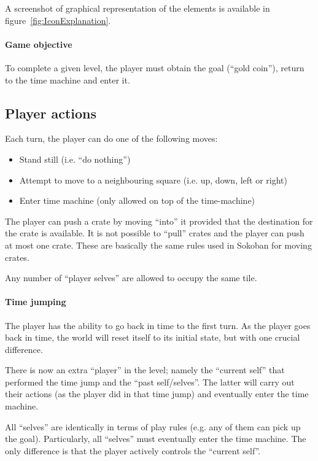 A screenshot of graphical representation of the elements is available
in figure~\ref{fig:IconExplanation}.


\paragraph{Game objective}
To complete a given level, the player must obtain the goal (``gold coin''),
return to the time machine and enter it.

\subsection{Player actions}
\label{player-actions}
Each turn, the player can do one of the following moves:

\begin{itemize}
\item Stand still (i.e. ``do nothing'')
\item Attempt to move to a neighbouring square (i.e. up, down, left or right)
\item Enter time machine (only allowed on top of the time-machine)
\end{itemize}

The player can push a crate by moving ``into'' it provided that the
destination for the crate is available.  It is not possible to
``pull'' crates and the player can push at most one crate.  These
are basically the same rules used in Sokoban for moving crates.

Any number of ``player selves'' are allowed to occupy the same
tile.

\paragraph{Time jumping}
\label{time-jumping}
The player has the ability to go back in time to the first turn.  As
the player goes back in time, the world will reset itself to its
initial state, but with one crucial difference.

There is now an extra ``player'' in the level; namely the ``current
self'' that performed the time jump and the ``past self/selves''.  The
latter will carry out their actions (as the player did in that time
jump) and eventually enter the time machine.

All ``selves'' are identically in terms of play rules (e.g. any of
them can pick up the goal).  Particularly, all ``selves'' must
eventually enter the time machine.  The only difference is that the
player actively controls the ``current self''.


